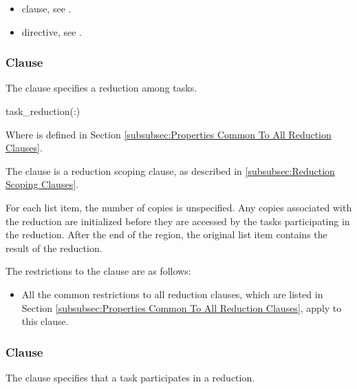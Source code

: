 \crossreferences
\begin{itemize}
    \item {} clause, see .
    \item {} directive, see .
\end{itemize}









\subsubsection{ Clause}
\label{subsubsec:task_reduction clause}
\summary
The  clause specifies a reduction among tasks.

\syntax
\begin{ompSyntax}
task_reduction(:)
\end{ompSyntax}
Where  is defined in Section
\ref{subsubsec:Properties Common To All Reduction Clauses}.

\descr
The  clause is a reduction scoping clause, as described in
\ref{subsubsec:Reduction Scoping Clauses}.

For each list item, the number of copies is unspecified. Any copies associated
with the reduction are initialized before they are accessed by the tasks
participating in the reduction. After the end of the region, the original list
item contains the result of the reduction.

\restrictions
The restrictions to the  clause are as follows:

\begin{itemize}
\item All the common restrictions to all reduction clauses, which are listed in
Section \ref{subsubsec:Properties Common To All Reduction Clauses}, apply to
this clause.
\end{itemize}











\subsubsection{ Clause}
\label{subsubsec:in_reduction clause}
\summary
The  clause specifies that a task participates in a reduction.

